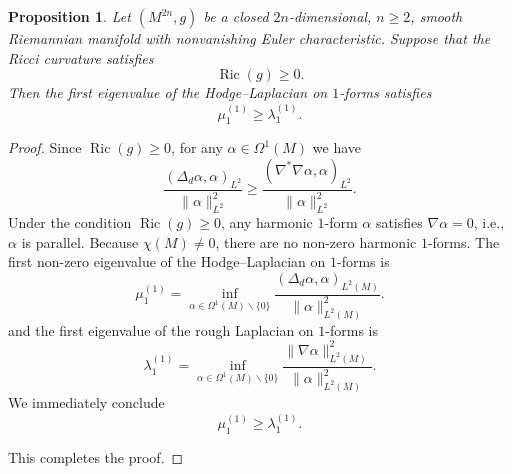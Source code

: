 \documentclass[12pt, twoside]{article}
\newtheorem{proposition}[theorem]{Proposition}
\theoremstyle{definition}
\numberwithin{equation}{section}
\def \a {\alpha }
\def\Om{\Omega}
\begin{document}
\begin{proposition}\label{prop:eigenvalue-Hodge-Laplacian}
	Let $(M^{2n},g)$ be a closed $2n$-dimensional, $n\ge 2$, smooth Riemannian manifold with nonvanishing Euler characteristic. Suppose that the Ricci curvature satisfies
	$$\operatorname{Ric}(g)\geq0.$$
	Then the first eigenvalue of the Hodge--Laplacian on $1$-forms satisfies
	\begin{equation*}
	\mu_{1}^{(1)}\geq\lambda^{(1)}_{1}.
	\end{equation*}
\end{proposition}
\begin{proof}
Since $\operatorname{Ric}(g) \ge 0$, for any $\alpha \in \Omega^1(M)$ we have
	\[
	\frac{(\Delta_d \alpha, \alpha)_{L^{2}}}{\|\alpha\|_{L^{2}}^{2}} \ge \frac{(\nabla^{*}\nabla \alpha, \alpha)_{L^{2}}}{\|\alpha\|_{L^{2}}^{2}}.
	\]
	Under the condition $\operatorname{Ric}(g) \ge 0$, any harmonic $1$-form $\alpha$ satisfies $\nabla\alpha = 0$, i.e., $\alpha$ is parallel. Because $\chi(M)\neq 0$, there are no non-zero harmonic $1$-forms. The first non-zero eigenvalue of the Hodge--Laplacian on $1$-forms is
	\[
	\mu^{(1)}_{1}= \inf_{\a\in\Om^{1}(M)\backslash\{0\}}\frac{(\Delta_{d}\alpha,\alpha)_{L^{2}(M)}}{\|\alpha\|^{2}_{L^{2}(M)}}.
	\]
	and the first eigenvalue of the rough Laplacian on $1$-forms is
	\[
	\lambda^{(1)}_{1}= \inf_{\a\in\Om^{1}(M)\backslash\{0\}}\frac{\|\nabla\alpha\|^{2}_{L^{2}(M)}}{\|\alpha\|^{2}_{L^{2}(M)}}.
	\]
We immediately conclude
	\[
	\mu^{(1)}_{1} \ge \lambda^{(1)}_{1}.
	\]
	
	\noindent This completes the proof.
\end{proof}
\end{document}
